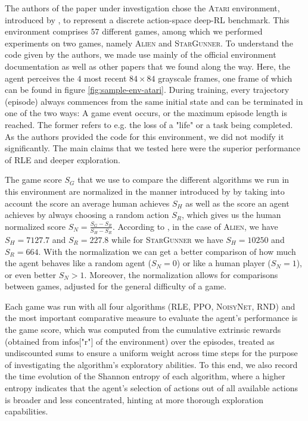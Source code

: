 \documentclass[10pt]{article} %
\begin{document}
The authors of the paper under investigation chose the \textsc{Atari} environment, introduced by \cite{atari-introduction}, to represent a discrete action-space deep-RL benchmark. This environment comprises $57$ different games, among which we performed experiments on two games, namely \textsc{Alien} and \textsc{StarGunner}. To understand the code given by the authors, we made use mainly of the official environment documentation as well as other papers that we found along the way. Here, the agent perceives the $4$ most recent $84\times84$ grayscale frames, one frame of which can be found in figure \ref{fig:sample-env-atari}. During training, every trajectory (episode) always commences from the same initial state and can be terminated in one of the two ways: A game event occurs, or the maximum episode length is reached. The former refers to e.g. the loss of a "life" or a task being completed. As the authors provided the code for this environment, we did not modify it significantly. The main claims that we tested here were the superior performance of \textsc{RLE} and deeper exploration.

\noindent The game score $S_{G}$ that we use to compare the different algorithms we run in this environment are normalized in the manner introduced by \cite{agent57} by taking into account the score an average human achieves $S_{H}$ as well as the score an agent achieves by always choosing a random action $S_{R}$, which gives us the human normalized score $S_{N} = \frac{S_{G} - S_{R}}{S_{H} - S_{R}}$. According to \cite{agent57}, in the case of \textsc{Alien}, we have $S_{H} = 7127.7$ and $S_{R} = 227.8$ while for \textsc{StarGunner} we have $S_{H} = 10250$ and $S_{R} = 664$. With the normalization we can get a better comparison of how much the agent behaves like a random agent ($S_{N} = 0$) or like a human player ($S_{N} = 1$), or even better $S_{N} > 1$. Moreover, the normalization allows for comparisons between games, adjusted for the general difficulty of a game.

\noindent Each game was run with all four algorithms (\textsc{RLE}, \textsc{PPO}, \textsc{NoisyNet}, \textsc{RND}) and the most important comparative measure to evaluate the agent's performance is the game score, which was computed from the cumulative extrinsic rewards (obtained from $\text{infos["r"]}$ of the environment) over the episodes, treated as undiscounted sums to ensure a uniform weight across time steps for the purpose of investigating the algorithm's exploratory abilities. To this end, we also record the time evolution of the Shannon entropy of each algorithm, where a higher entropy indicates that the agent's selection of actions out of all available actions is broader and less concentrated, hinting at more thorough exploration capabilities.
\end{document}
